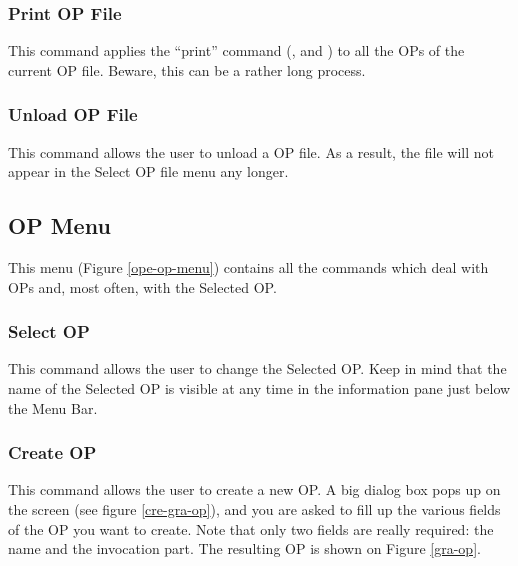 \subsubsection{Print OP File}

This command applies the ``print'' command (, and
) to all the OPs of the current OP
file. Beware, this can be a rather long process.

\subsubsection{Unload OP File}

This command allows the user to unload a OP file. As a result, the file
will not appear in the Select OP file menu any longer.

\subsection{OP Menu}


This menu (Figure \ref{ope-op-menu}) contains all the commands which deal with OPs and, most often,
with the Selected OP.



\subsubsection{Select OP}

This command allows the user to change the Selected OP. Keep in mind that
the name of the Selected OP is visible at any time in the information
pane just below the Menu Bar.

\subsubsection{Create OP}



This command allows the user to create a new OP. A big dialog box pops up on
the screen (see figure \ref{cre-gra-op}), and you are asked to fill up the
various fields of the OP you want to create. Note that only two fields are
really required: the name and the invocation part. The resulting OP is shown
on Figure \ref{gra-op}. 

